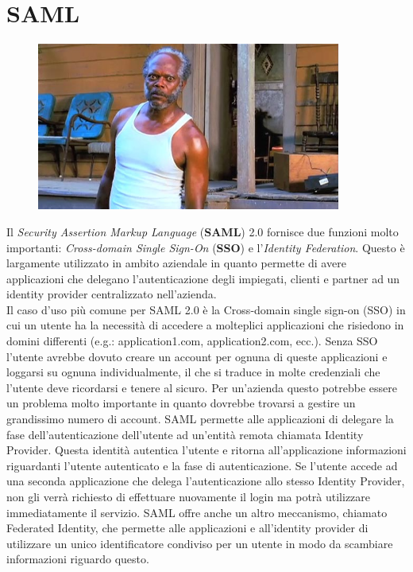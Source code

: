 \chapter{SAML}

\begin{figure}[H]
    \centering
    \includegraphics[width=10cm, keepaspectratio]{capitoli/id_managing/imgs/samuel.jpg}
\end{figure}

Il \textit{Security Assertion Markup Language} (\textbf{SAML}) 2.0 fornisce due
funzioni molto importanti: \textit{Cross-domain Single Sign-On} (\textbf{SSO}) e
l'\textit{Identity Federation}. Questo è largamente utilizzato in ambito aziendale
in quanto permette di avere applicazioni che delegano l'autenticazione degli impiegati,
clienti e partner ad un identity provider centralizzato nell'azienda.\\

Il caso d'uso più comune per SAML 2.0 è la Cross-domain single sign-on (SSO) in cui
un utente ha la necessità di accedere a molteplici applicazioni che risiedono in
domini differenti (e.g.: application1.com, application2.com, ecc.).
Senza SSO l'utente avrebbe dovuto creare un account per ognuna di queste applicazioni
e loggarsi su ognuna individualmente, il che si traduce in molte credenziali che
l'utente deve ricordarsi e tenere al sicuro. Per un'azienda questo potrebbe essere
un problema molto importante in quanto dovrebbe trovarsi a gestire un grandissimo
numero di account. SAML permette alle applicazioni di delegare la fase dell'autenticazione
dell'utente ad un'entità remota chiamata Identity Provider.
Questa identità autentica l'utente e ritorna all'applicazione informazioni riguardanti
l'utente autenticato e la fase di autenticazione. Se l'utente accede ad una seconda
applicazione che delega l'autenticazione allo stesso Identity Provider,
non gli verrà richiesto di effettuare nuovamente il login ma potrà utilizzare
immediatamente il servizio.
SAML offre anche un altro meccanismo, chiamato Federated Identity, che permette
alle applicazioni e all'identity provider di utilizzare un unico identificatore
condiviso per un utente in modo da scambiare informazioni riguardo questo.

